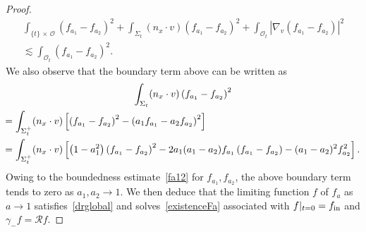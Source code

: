 \documentclass[AHL,Unicode,longabstracts,published]{cedram}
\newcommand*\fin {f_{\rm in}}
\newcommand*\RR {\mathcal{R}}
\newcommand*\OO {\mathcal{O}}
\begin{document}
\begin{proof}
\begin{multline*}
\int_{\{t\}\,\times\,\OO} \left(f_{a_1}-f_{a_2}\right)^2 + \int_{\Sigma_t}\left(n_x\cdot v\right) \left(f_{a_1}-f_{a_2}\right)^2 +\int_{\OO_t}\left|\nabla_v\left(f_{a_1}-f_{a_2}\right)\right|^2\\
\lesssim \int_{\OO_t}\left(f_{a_1}-f_{a_2}\right)^2.
\end{multline*}
We also observe that the boundary term above can be written as
\begin{multline*}
\int_{\Sigma_t}(n_x\cdot v) \left(f_{a_1}-f_{a_2}\right)^2
\\
\mkern-10mu\begin{aligned}
&= \int_{\Sigma_t^+}(n_x\cdot v) \left[\left(f_{a_1}-f_{a_2}\right)^2-\left(a_1f_{a_1}-a_2f_{a_2}\right)^2\right]\\
&= \int_{\Sigma_t^+}(n_x\cdot v) \left[\left(1-a_1^2\right)\left(f_{a_1}-f_{a_2}\right)^2-2a_1(a_1-a_2)f_{a_1}\left(f_{a_1}-f_{a_2}\right)-(a_1-a_2)^2f_{a_2}^2\right].
\end{aligned}
\end{multline*}
Owing to the boundedness estimate~\eqref{fa12} for $f_{a_1},f_{a_2}$, the above boundary term tends to zero as $a_1,a_2\rightarrow1$. We then deduce that the limiting function $f$ of $f_a$ as $a\rightarrow1$ satisfies~\eqref{drglobal} and solves~\eqref{existenceFa} associated with $f|_{t=0}=\fin$ and $\gamma_-f=\RR f$.


\end{proof}
\end{document}

